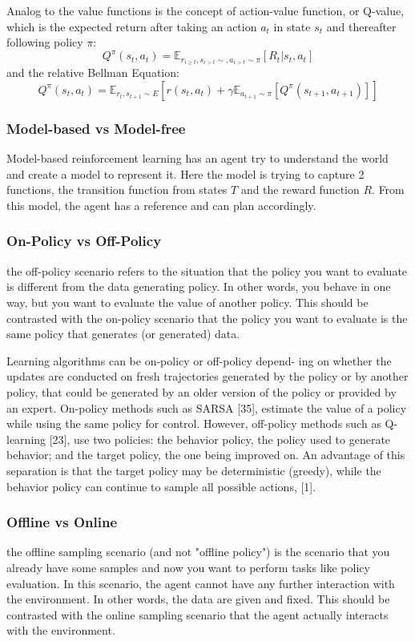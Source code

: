 Analog to the value functions is the concept of action-value function, or Q-value, which is the expected return after taking an action \(a_t\) in state \(s_t\) and thereafter following policy \(\pi\):
\[Q^\pi(s_t,a_t)=\mathbb{E}_{r_{i \geq t},s_{i>t} \sim ,a_{i>t} \sim \pi}[R_t|s_t,a_t]\]
and the relative Bellman Equation:
\[Q^\pi(s_t,a_t)=\mathbb{E}_{r_t,s_{t+1} \sim E }\left[ r(s_t,a_t) + \gamma \mathbb{E}_{a_{t+1} \sim \pi}\left[Q^\pi (s_{t+1},a_{t+1})\right]\right]\]



\subsubsection{Model-based vs Model-free}
Model-based reinforcement learning has an agent try to understand the world and create a model to represent it. Here the model is trying to capture 2 functions, the transition function from states $T$ and the reward function $R$. From this model, the agent has a reference and can plan accordingly.
\subsubsection{On-Policy vs Off-Policy}
the off-policy scenario refers to the situation that the policy you want to evaluate is different from the data generating policy. In other words, you behave in one way, but you want to evaluate the value of another policy. This should be contrasted with the on-policy scenario that the policy you want to evaluate is the same policy that generates (or generated) data.


Learning algorithms can be on-policy or off-policy depend-
ing on whether the updates are conducted on fresh trajectories
generated by the policy or by another policy, that could be
generated by an older version of the policy or provided by an
expert. On-policy methods such as SARSA [35], estimate the
value of a policy while using the same policy for control.
However, off-policy methods such as Q-learning [23], use
two policies: the behavior policy, the policy used to generate
behavior; and the target policy, the one being improved on. An
advantage of this separation is that the target policy may be
deterministic (greedy), while the behavior policy can continue
to sample all possible actions, [1].

\subsubsection{Offline vs Online}
the offline sampling scenario (and not "offline policy") is the scenario that you already have some samples and now you want to perform tasks like policy evaluation. In this scenario, the agent cannot have any further interaction with the environment. In other words, the data are given and fixed. This should be contrasted with the online sampling scenario that the agent actually interacts with the environment.

